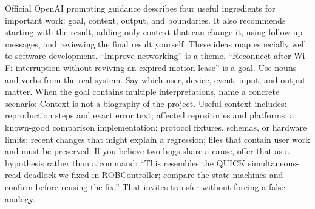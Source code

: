 {}Official OpenAI prompting guidance describes four useful ingredients for\markdownRendererSoftLineBreak
{}important work: goal, context, output, and boundaries. It also recommends\markdownRendererSoftLineBreak
{}starting with the result, adding only context that can change it, using\markdownRendererSoftLineBreak
{}follow-up messages, and reviewing the final result yourself. These ideas map\markdownRendererSoftLineBreak
{}especially well to software development.\markdownRendererInterblockSeparator
{}\markdownRendererSectionBegin
{}\markdownRendererInterblockSeparator
{}“Improve networking” is a theme. “Reconnect after Wi-Fi interruption without\markdownRendererSoftLineBreak
{}reviving an expired motion lease” is a goal. Use nouns and verbs from the real\markdownRendererSoftLineBreak
{}system. Say which user, device, event, input, and output matter.\markdownRendererParagraphSeparator
{}When the goal contains multiple interpretations, name a concrete scenario:\markdownRendererInterblockSeparator
{}\markdownRendererInterblockSeparator
{}
\markdownRendererSectionEnd \markdownRendererSectionBegin
{}\markdownRendererInterblockSeparator
{}Context is not a biography of the project. Useful context includes:\markdownRendererInterblockSeparator
{}\markdownRendererUlBegin
\markdownRendererUlItem reproduction steps and exact error text;\markdownRendererUlItemEnd 
\markdownRendererUlItem affected repositories and platforms;\markdownRendererUlItemEnd 
\markdownRendererUlItem a known-good comparison implementation;\markdownRendererUlItemEnd 
\markdownRendererUlItem protocol fixtures, schemas, or hardware limits;\markdownRendererUlItemEnd 
\markdownRendererUlItem recent changes that might explain a regression;\markdownRendererUlItemEnd 
\markdownRendererUlItem files that contain user work and must be preserved.\markdownRendererUlItemEnd 
\markdownRendererUlEnd \markdownRendererInterblockSeparator
{}If you believe two bugs share a cause, offer that as a hypothesis rather than a\markdownRendererSoftLineBreak
{}command: “This resembles the QUICK simultaneous-read deadlock we fixed in\markdownRendererSoftLineBreak
{}ROBController; compare the state machines and confirm before reusing the fix.”\markdownRendererSoftLineBreak
{}That invites transfer without forcing a false analogy.\markdownRendererInterblockSeparator
